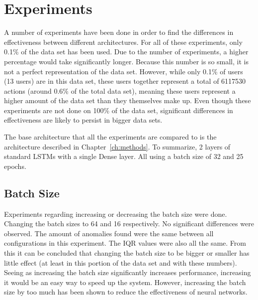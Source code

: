 \chapter{Experiments}\label{ch:experiments}

A number of experiments have been done in order to find the differences in effectiveness between different architectures. For all of these experiments, only 0.1\% of the data set has been used. Due to the number of experiments, a higher percentage would take significantly longer. Because this number is so small, it is not a perfect representation of the data set. However, while only 0.1\% of users (13 users) are in this data set, these users together represent a total of 6117530 actions (around 0.6\% of the total data set), meaning these users represent a higher amount of the data set than they themselves make up. Even though these experiments are not done on 100\% of the data set, significant differences in effectiveness are likely to persist in bigger data sets.

The base architecture that all the experiments are compared to is the architecture described in Chapter~\ref{ch:methods}. To summarize, 2 layers of standard LSTMs with a single Dense layer. All using a batch size of 32 and 25 epochs.

\section{Batch Size}
Experiments regarding increasing or decreasing the batch size were done. Changing the batch sizes to 64 and 16 respectively. No significant differences were observed. The amount of anomalies found were the same between all configurations in this experiment. The IQR values were also all the same. From this it can be concluded that changing the batch size to be bigger or smaller has little effect (at least in this portion of the data set and with these numbers). Seeing as increasing the batch size significantly increases performance, increasing it would be an easy way to speed up the system. However, increasing the batch size by too much has been shown to reduce the effectiveness of neural networks.



